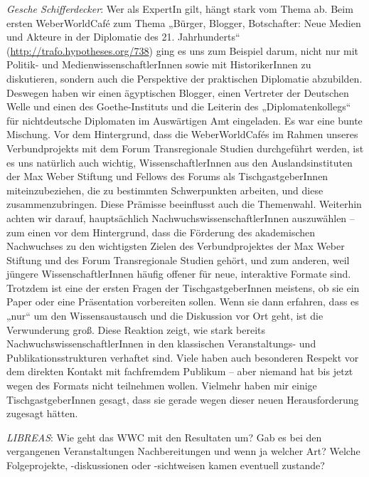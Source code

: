 \documentclass[a4paper,
fontsize=11pt,
oneside,
numbers=noperiodatend,
parskip=half-,
bibliography=totoc,
final
]{scrartcl}
\begin{document}
\emph{Gesche Schifferdecker}: Wer als ExpertIn gilt, hängt stark vom
Thema ab. Beim ersten WeberWorldCafé zum Thema „Bürger, Blogger,
Botschafter: Neue Medien und Akteure in der Diplomatie des 21.
Jahrhunderts`` (\url{http://trafo.hypotheses.org/738}) ging es uns zum
Beispiel darum, nicht nur mit Politik- und MedienwissenschaftlerInnen
sowie mit HistorikerInnen zu diskutieren, sondern auch die Perspektive
der praktischen Diplomatie abzubilden. Deswegen haben wir einen
ägyptischen Blogger, einen Vertreter der Deutschen Welle und einen des
Goethe-Instituts und die Leiterin des „Diplomatenkollegs`` für
nichtdeutsche Diplomaten im Auswärtigen Amt eingeladen. Es war eine
bunte Mischung. Vor dem Hintergrund, dass die WeberWorldCafés im Rahmen
unseres Verbundprojekts mit dem Forum Transregionale Studien
durchgeführt werden, ist es uns natürlich auch wichtig,
WissenschaftlerInnen aus den Auslandsinstituten der Max Weber Stiftung
und Fellows des Forums als TischgastgeberInnen miteinzubeziehen, die zu
bestimmten Schwerpunkten arbeiten, und diese zusammenzubringen. Diese
Prämisse beeinflusst auch die Themenwahl. Weiterhin achten wir darauf,
hauptsächlich NachwuchswissenschaftlerInnen auszuwählen -- zum einen vor
dem Hintergrund, dass die Förderung des akademischen Nachwuchses zu den
wichtigsten Zielen des Verbundprojektes der Max Weber Stiftung und des
Forum Transregionale Studien gehört, und zum anderen, weil jüngere
WissenschaftlerInnen häufig offener für neue, interaktive Formate sind.
Trotzdem ist eine der ersten Fragen der TischgastgeberInnen meistens, ob
sie ein Paper oder eine Präsentation vorbereiten sollen. Wenn sie dann
erfahren, dass es „nur`` um den Wissensaustausch und die Diskussion vor
Ort geht, ist die Verwunderung groß. Diese Reaktion zeigt, wie stark
bereits NachwuchswissenschaftlerInnen in den klassischen Veranstaltungs-
und Publikationsstrukturen verhaftet sind. Viele haben auch besonderen
Respekt vor dem direkten Kontakt mit fachfremdem Publikum -- aber
niemand hat bis jetzt wegen des Formats nicht teilnehmen wollen.
Vielmehr haben mir einige TischgastgeberInnen gesagt, dass sie gerade
wegen dieser neuen Herausforderung zugesagt hätten.

\emph{LIBREAS}: Wie geht das WWC mit den Resultaten um? Gab es bei den
vergangenen Veranstaltungen Nachbereitungen und wenn ja welcher Art?
Welche Folgeprojekte, -diskussionen oder -sichtweisen kamen eventuell
zustande?
\end{document}

